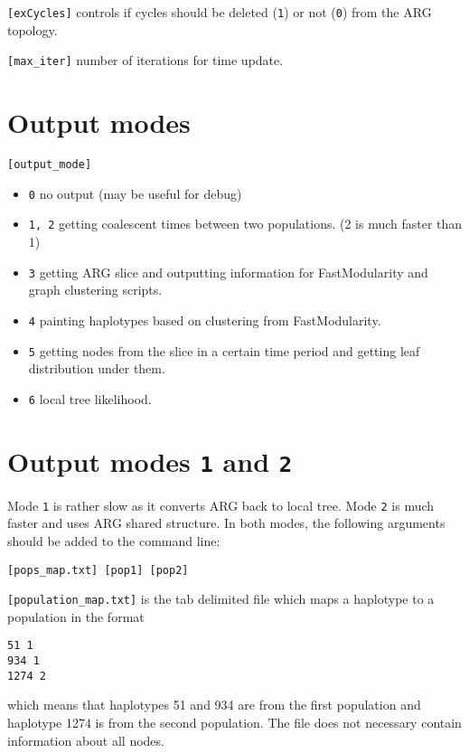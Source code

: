 \documentclass[11pt]{amsart}
\theoremstyle{definition}
\theoremstyle{remark}
\begin{document}
	\texttt{[exCycles]} controls if cycles should be deleted (\texttt{1}) or not (\texttt{0}) from the ARG topology.
	
	\texttt{[max\_iter]} number of iterations for time update.
	
\section{Output modes}

	\texttt{[output\_mode]}
	\begin{itemize}
		\item \texttt{0} no output (may be useful for debug)
		\item \texttt{1, 2} getting coalescent times between two populations. (2 is much faster than 1)
		\item \texttt{3} getting ARG slice and outputting information for FastModularity and graph clustering scripts.
		\item \texttt{4} painting haplotypes based on clustering from FastModularity.
		\item \texttt{5} getting nodes from the slice in a certain time period and getting leaf distribution under them.
		\item \texttt{6} local tree likelihood.
	\end{itemize}

\section{Output modes \texttt{1} and \texttt{2} }
	Mode \texttt{1} is rather slow as it converts ARG back to local tree. Mode \texttt{2} is much faster and uses ARG shared structure. In both modes, the following arguments should be added to the command line:
	\begin{displayquote}
		\texttt{[pops\_map.txt] [pop1] [pop2]}
	\end{displayquote}
	
	\texttt{[population\_map.txt]} is the tab delimited file which maps a haplotype to a population in the format
	\begin{displayquote}
		\texttt{51	1\\
		934	1\\
		1274	2}
	\end{displayquote}
	which means that haplotypes 51 and 934 are from the first population and haplotype 1274 is from the second population. The file does not necessary contain information about all nodes.
	
\end{document}

